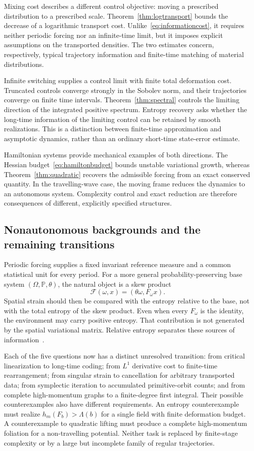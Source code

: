\documentclass[review,12pt,times,a4paper,nopreprintline]{elsarticle}
\theoremstyle{plain}
\theoremstyle{definition}
\theoremstyle{remark}
\numberwithin{equation}{section}
\begin{document}
Mixing cost describes a different control objective: moving a prescribed distribution to a prescribed scale. Theorem~\ref{thm:logtransport} bounds the decrease of a logarithmic transport cost. Unlike~\eqref{eq:informationcost}, it requires neither periodic forcing nor an infinite-time limit, but it imposes explicit assumptions on the transported densities. The two estimates concern, respectively, typical trajectory information and finite-time matching of material distributions.

Infinite switching supplies a control limit with finite total deformation cost. Truncated controls converge strongly in the Sobolev norm, and their trajectories converge on finite time intervals. Theorem~\ref{thm:spectral} controls the limiting direction of the integrated positive spectrum. Entropy recovery asks whether the long-time information of the limiting control can be retained by smooth realizations. This is a distinction between finite-time approximation and asymptotic dynamics, rather than an ordinary short-time state-error estimate.

Hamiltonian systems provide mechanical examples of both directions. The Hessian budget~\eqref{eq:hamiltonbudget} bounds unstable variational growth, whereas Theorem~\ref{thm:quadratic} recovers the admissible forcing from an exact conserved quantity. In the travelling-wave case, the moving frame reduces the dynamics to an autonomous system. Complexity control and exact reduction are therefore consequences of different, explicitly specified structures.

\subsection{Nonautonomous backgrounds and the remaining transitions}
Periodic forcing supplies a fixed invariant reference measure and a common statistical unit for every period. For a more general probability-preserving base system $(\Omega,\mathbb P,\theta)$, the natural object is a skew product
\[
 \mathcal F(\omega,x)=(\theta\omega,F_\omega x).
\]
Spatial strain should then be compared with the entropy relative to the base, not with the total entropy of the skew product. Even when every $F_\omega$ is the identity, the environment may carry positive entropy. That contribution is not generated by the spatial variational matrix. Relative entropy separates these sources of information~\cite{Walters}.

Each of the five questions now has a distinct unresolved transition: from critical linearization to long-time coding; from $L^1$ derivative cost to finite-time rearrangement; from singular strain to cancellation for arbitrary transported data; from symplectic iteration to accumulated primitive-orbit counts; and from complete high-momentum graphs to a finite-degree first integral. Their possible counterexamples also have different requirements. An entropy counterexample must realize $h_m(F_b)>\Lambda(b)$ for a single field with finite deformation budget. A counterexample to quadratic lifting must produce a complete high-momentum foliation for a non-travelling potential. Neither task is replaced by finite-stage complexity or by a large but incomplete family of regular trajectories.
\end{document}
